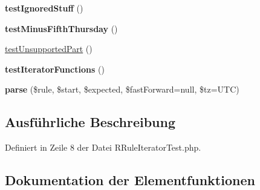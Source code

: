 \begin{DoxyCompactItemize}
\mbox{\label{class_sabre_1_1_v_object_1_1_recur_1_1_r_rule_iterator_test_a08d0ca784368f03839df0e8c19fa310b}} 
{\bfseries test\+Ignored\+Stuff} ()
\item 
\mbox{\label{class_sabre_1_1_v_object_1_1_recur_1_1_r_rule_iterator_test_a8f0df1818ae2e826f6486b5e2fcd19ad}} 
{\bfseries test\+Minus\+Fifth\+Thursday} ()
\item 
\mbox{\hyperlink{class_sabre_1_1_v_object_1_1_recur_1_1_r_rule_iterator_test_a10756f1e232d6f15565f4778e92b1a64}{test\+Unsupported\+Part}} ()
\item 
\mbox{\label{class_sabre_1_1_v_object_1_1_recur_1_1_r_rule_iterator_test_a849ea28cf818f97b138c3a0f6a983f63}} 
{\bfseries test\+Iterator\+Functions} ()
\item 
\mbox{\label{class_sabre_1_1_v_object_1_1_recur_1_1_r_rule_iterator_test_afd98457a60a70eda868cf09d3bc85432}} 
{\bfseries parse} (\$rule, \$start, \$expected, \$fast\+Forward=null, \$tz=\textquotesingle{}U\+TC\textquotesingle{})
\end{DoxyCompactItemize}


\subsection{Ausführliche Beschreibung}


Definiert in Zeile 8 der Datei R\+Rule\+Iterator\+Test.\+php.



\subsection{Dokumentation der Elementfunktionen}
\mbox{\label{class_sabre_1_1_v_object_1_1_recur_1_1_r_rule_iterator_test_a9bb98e8d177146475ac9cb75f273dbd8}} 
